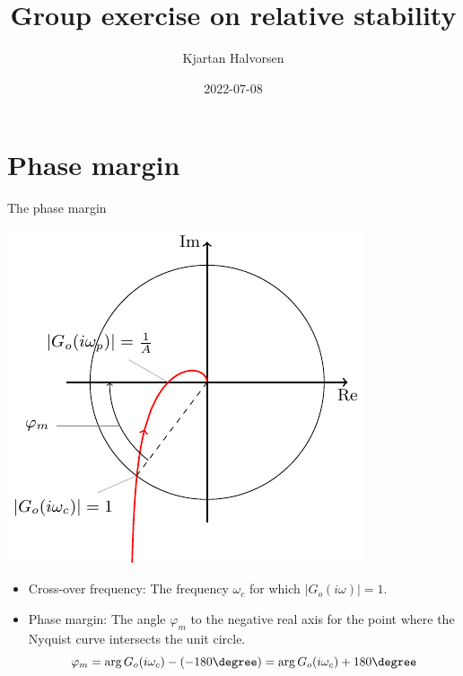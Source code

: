 \documentclass[presentation,aspectratio=169]{beamer}
\author{Kjartan Halvorsen}
\date{2022-07-08}
\title{Group exercise on relative stability}
\begin{document}
\maketitle

\section{Phase margin}
\label{sec:org76bc68e}
\begin{frame}[label={sec:org7db894d}]{The phase margin}
\begin{center}
\includegraphics[width=0.38\linewidth]{../../figures/implane-nyquist-margins}
\end{center}
\begin{itemize}
\item Cross-over frequency: The frequency \(\omega_c\) for which \(|G_o(i\omega)| = 1\).
\item Phase margin: The angle \(\varphi_m\) to the negative real axis for the point where the Nyquist curve intersects the unit circle. \[\varphi_m = \arg G_o(i\omega_c) - (-180\degree) = \arg G_o(i\omega_c) + 180\degree\]
\end{itemize}
\end{frame}
\end{document}

